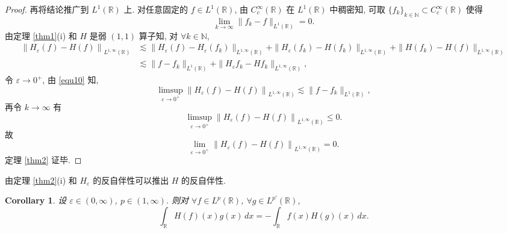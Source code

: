 \documentclass[a4paper,11pt]{article}
\newtheorem{corollary}[theorem]{Corollary}
\theoremstyle{definition}
\begin{document}
\begin{CJK*}{UTF8}{gbsn}
\begin{proof}
    再将结论推广到 $ L^1(\mathbb{R}) $ 上.
    对任意固定的 $ f \in L^1(\mathbb{R}) $, 
    由 $ C_c^\infty(\mathbb{R}) $ 在 $ L^1(\mathbb{R}) $ 中稠密知, 
    可取 $ \{f_k\}_{k \in \mathbb{N}} \subset C_c^\infty(\mathbb{R}) $ 使得
    $$
        \lim_{k \to \infty} \| f_k - f \|_{L^1(\mathbb{R})} = 0.
    $$
    由定理 \ref{thm1}(i) 和 $ H $ 是弱 $ (1,1) $ 算子知, 对 $ \forall k \in \mathbb{N} $,
    \begin{align*}
        \left\| H_\varepsilon (f) - H (f) \right\|_{L^{1, \infty}(\mathbb{R})} 
            &\lesssim \| H_\varepsilon (f) - H_\varepsilon (f_k) \|_{L^{1, \infty}(\mathbb{R})}  
                + \| H_\varepsilon (f_k) - H (f_k) \|_{L^{1, \infty}(\mathbb{R})}
                + \| H (f_k) - H (f) \|_{L^{1, \infty}(\mathbb{R})} \\
            &\lesssim \| f - f_k \|_{L^1(\mathbb{R})} 
                + \| H_\varepsilon f_k - H f_k \|_{L^{1, \infty}(\mathbb{R})},
    \end{align*}
    令 $ \varepsilon \to 0^+ $, 由 \eqref{equ10} 知,
    $$
        \limsup_{\varepsilon \to 0^+} \left\| H_\varepsilon (f) - H (f) \right\|_{L^{1, \infty}(\mathbb{R})} 
            \lesssim  \| f - f_k \|_{L^1(\mathbb{R})},
    $$
    再令 $ k \to \infty $ 有
    $$
        \limsup_{\varepsilon \to 0^+} \left\| H_\varepsilon (f) - H (f) \right\|_{L^{1, \infty}(\mathbb{R})} \leq 0.
    $$
    故
    $$
        \lim_{\varepsilon \to 0^+} \left\| H_\varepsilon (f) - H (f) \right\|_{L^{1, \infty}(\mathbb{R})} = 0.
    $$
    定理 \ref{thm2} 证毕.
\end{proof}


由定理 \ref{thm2}(i) 和 $ H_\varepsilon $ 的反自伴性可以推出 $ H $ 的反自伴性.

\begin{corollary} \label{thm4}
    设 $ \varepsilon \in (0, \infty) $, $ p \in (1, \infty) $. 
    则对 $ \forall f \in L^p(\mathbb{R}) $, $ \forall g \in L^{p'}(\mathbb{R}) $,
    $$
        \int_\mathbb{R} H (f)(x) g(x) \, dx
            = -\int_\mathbb{R} f(x) H (g)(x) \, dx.
    $$
\end{corollary}


\end{CJK*}
\end{document}
